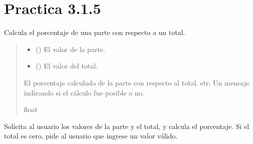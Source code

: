 \documentclass[letterpaper,10pt,spanish]{sphinxmanual}
\begin{document}
\section{Practica 3.1.5}
\label{\detokenize{pr3:module-pr3.1_5}}\label{\detokenize{pr3:practica-3-1-5}}

\begin{fulllineitems}
\label{\detokenize{pr3:pr3.1_5.calcular_porcentaje}}
\pysigstartsignatures
{}
\pysigstopsignatures
\sphinxAtStartPar
Calcula el porcentaje de una parte con respecto a un total.
\begin{quote}\begin{description}
\begin{itemize}
\item {} 
\sphinxAtStartPar
{} () \textendash{} El valor de la parte.

\item {} 
\sphinxAtStartPar
{} () \textendash{} El valor del total.

\end{itemize}

\sphinxAtStartPar
El porcentaje calculado de la parte con respecto al total.
str: Un mensaje indicando si el cálculo fue posible o no.

\sphinxAtStartPar
float

\end{description}\end{quote}

\end{fulllineitems}


\begin{fulllineitems}
\label{\detokenize{pr3:pr3.1_5.main}}
\pysigstartsignatures
{}
\pysigstopsignatures
\sphinxAtStartPar
Solicita al usuario los valores de la parte y el total, y calcula el porcentaje.
Si el total es cero, pide al usuario que ingrese un valor válido.

\end{fulllineitems}
\end{document}
